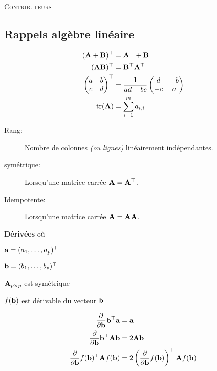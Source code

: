 \documentclass[10pt, french]{article}
\begin{document}
\begin{center}
	\textsc{\Large Contributeurs}\\[0.5cm] 
\end{center}


\newpage

\begin{multicols*}{3} 
\section*{Rappels algèbre linéaire}

\begin{align*}
	\mathbf{(A + B)^{\top}} &= \mathbf{A}^{\top} + \mathbf{B}^{\top} \\
	\mathbf{(AB)^{\top}} &= \mathbf{B}^{\top}\mathbf{A}^{\top} \\
	\begin{pmatrix}
		a	&	b	\\
		c	&	d	\\
	\end{pmatrix}^{\top}
	&=
	\frac{1}{ad - bc} 
	\begin{pmatrix}
		d	&	-b	\\
		-c	&	a	\\
	\end{pmatrix}	\\
	\text{tr}(\mathbf{A}) &= \sum^{m}_{i = 1} a_{i, i} \\
\end{align*}

\begin{description}
	\item[Rang:] Nombre de colonnes \textit{(ou lignes)} linéairement indépendantes.
	\item[symétrique:] Lorsqu'une matrice carrée $\mathbf{A} = \mathbf{A}^{\top}$.
	\item[Idempotente:] Lorsqu'une matrice carrée $\mathbf{A} = \mathbf{A}\mathbf{A}$.
\end{description}

\textbf{Dérivées} où 
\begin{description}
	\item $\mathbf{a} = (a_{1}, \dots, a_{p})^{\top}$ 
	\item $\mathbf{b} = (b_{1}, \dots, b_{p})^{\top}$ 
	\item $\mathbf{A}_{p \times p}$ est symétrique 
	\item $f(\mathbf{b})$ est dérivable du vecteur $\mathbf{b}$
\end{description}
\begin{align*}
	\frac{\partial}{\partial \mathbf{b}} \mathbf{b^{\top}} \mathbf{a} &= \mathbf{a}	\\
	\frac{\partial}{\partial \mathbf{b}} \mathbf{b^{\top}} \mathbf{A} \mathbf{b} &= 2 \mathbf{A}\mathbf{b}	\\
	\frac{\partial}{\partial \mathbf{b}} f(\mathbf{b})^{\top} \mathbf{A} f(\mathbf{b}) &= 2 \left(\frac{\partial}{\partial \mathbf{b}} f(\mathbf{b}) \right)^{\top} \mathbf{A} f(\mathbf{b})	\\
\end{align*}


\end{multicols*}
\end{document}
